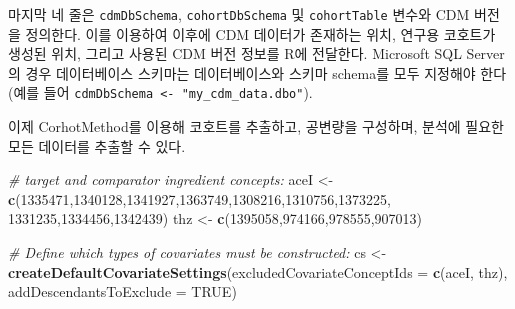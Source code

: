 \documentclass[10.5pt]{book}
\newenvironment{Shaded}{\begin{snugshade}}{\end{snugshade}}
\newcommand{\KeywordTok}[1]{\textcolor[rgb]{0.13,0.29,0.53}{\textbf{#1}}}
\newcommand{\DataTypeTok}[1]{\textcolor[rgb]{0.13,0.29,0.53}{#1}}
\newcommand{\DecValTok}[1]{\textcolor[rgb]{0.00,0.00,0.81}{#1}}
\newcommand{\StringTok}[1]{\textcolor[rgb]{0.31,0.60,0.02}{#1}}
\newcommand{\CommentTok}[1]{\textcolor[rgb]{0.56,0.35,0.01}{\textit{#1}}}
\newcommand{\OtherTok}[1]{\textcolor[rgb]{0.56,0.35,0.01}{#1}}
\newcommand{\NormalTok}[1]{#1}
\theoremstyle{definition}
\theoremstyle{definition}
\theoremstyle{definition}
\theoremstyle{remark}
\begin{document}
마지막 네 줄은 \texttt{cdmDbSchema}, \texttt{cohortDbSchema} 및
\texttt{cohortTable} 변수와 CDM 버전을 정의한다. 이를 이용하여 이후에
CDM 데이터가 존재하는 위치, 연구용 코호트가 생성된 위치, 그리고 사용된
CDM 버전 정보를 R에 전달한다. Microsoft SQL Server의 경우 데이터베이스
스키마는 데이터베이스와 스키마 schema를 모두 지정해야 한다 (예를 들어
\texttt{cdmDbSchema\ \textless{}-\ "my\_cdm\_data.dbo"}).

이제 CorhotMethod를 이용해 코호트를 추출하고, 공변량을 구성하며, 분석에
필요한 모든 데이터를 추출할 수 있다.

\begin{Shaded}
\begin{Highlighting}[]
\CommentTok{# target and comparator ingredient concepts:}
\NormalTok{aceI <-}\StringTok{ }\KeywordTok{c}\NormalTok{(}\DecValTok{1335471}\NormalTok{,}\DecValTok{1340128}\NormalTok{,}\DecValTok{1341927}\NormalTok{,}\DecValTok{1363749}\NormalTok{,}\DecValTok{1308216}\NormalTok{,}\DecValTok{1310756}\NormalTok{,}\DecValTok{1373225}\NormalTok{,}
          \DecValTok{1331235}\NormalTok{,}\DecValTok{1334456}\NormalTok{,}\DecValTok{1342439}\NormalTok{)}
\NormalTok{thz <-}\StringTok{ }\KeywordTok{c}\NormalTok{(}\DecValTok{1395058}\NormalTok{,}\DecValTok{974166}\NormalTok{,}\DecValTok{978555}\NormalTok{,}\DecValTok{907013}\NormalTok{)}

\CommentTok{# Define which types of covariates must be constructed:}
\NormalTok{cs <-}\StringTok{ }\KeywordTok{createDefaultCovariateSettings}\NormalTok{(}\DataTypeTok{excludedCovariateConceptIds =} \KeywordTok{c}\NormalTok{(aceI,}
\NormalTok{                                                                     thz),}
                                     \DataTypeTok{addDescendantsToExclude =} \OtherTok{TRUE}\NormalTok{)}


\end{Highlighting}
\end{Shaded}
\end{document}
